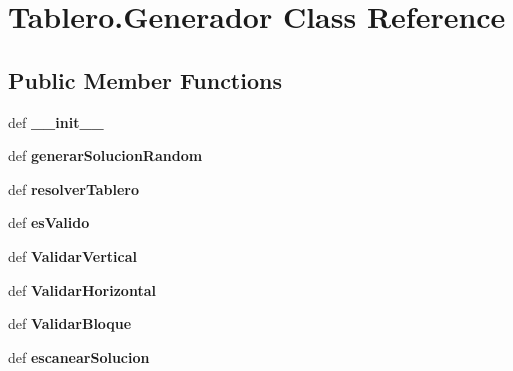 \hypertarget{class_tablero_1_1_generador}{\section{Tablero.\-Generador Class Reference}
\label{class_tablero_1_1_generador}
}
\subsection*{Public Member Functions}
\begin{DoxyCompactItemize}
\item 
\hypertarget{class_tablero_1_1_generador_a5905dcb68004105106ff0b34da2e3c70}{def {\bfseries \-\_\-\-\_\-init\-\_\-\-\_\-}}\label{class_tablero_1_1_generador_a5905dcb68004105106ff0b34da2e3c70}

\item 
\hypertarget{class_tablero_1_1_generador_a9163d8790feb0de72c7e5f6a92c19356}{def {\bfseries generar\-Solucion\-Random}}\label{class_tablero_1_1_generador_a9163d8790feb0de72c7e5f6a92c19356}

\item 
\hypertarget{class_tablero_1_1_generador_ab8ea34613494302bab1a480bcb97cff6}{def {\bfseries resolver\-Tablero}}\label{class_tablero_1_1_generador_ab8ea34613494302bab1a480bcb97cff6}

\item 
\hypertarget{class_tablero_1_1_generador_a38af03bba1b3304770af3602f8fa6f85}{def {\bfseries es\-Valido}}\label{class_tablero_1_1_generador_a38af03bba1b3304770af3602f8fa6f85}

\item 
\hypertarget{class_tablero_1_1_generador_a50f44e99b4338b0eb1a9a400653c48fa}{def {\bfseries Validar\-Vertical}}\label{class_tablero_1_1_generador_a50f44e99b4338b0eb1a9a400653c48fa}

\item 
\hypertarget{class_tablero_1_1_generador_aa0fd80802a7c9222c898f8a44c12e404}{def {\bfseries Validar\-Horizontal}}\label{class_tablero_1_1_generador_aa0fd80802a7c9222c898f8a44c12e404}

\item 
\hypertarget{class_tablero_1_1_generador_a612ac862468583b8267e6cc5d06c70aa}{def {\bfseries Validar\-Bloque}}\label{class_tablero_1_1_generador_a612ac862468583b8267e6cc5d06c70aa}

\item 
\hypertarget{class_tablero_1_1_generador_af91a616789e1d371313ac6ff881520d4}{def {\bfseries escanear\-Solucion}}\label{class_tablero_1_1_generador_af91a616789e1d371313ac6ff881520d4}


\end{DoxyCompactItemize}
